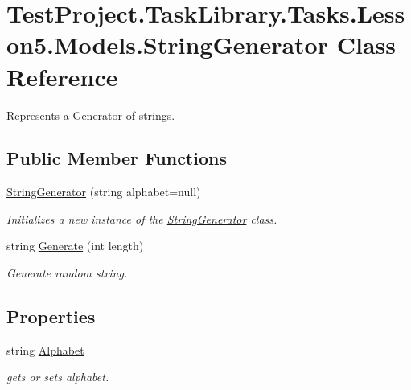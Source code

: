 \hypertarget{class_test_project_1_1_task_library_1_1_tasks_1_1_lesson5_1_1_models_1_1_string_generator}{}\section{Test\+Project.\+Task\+Library.\+Tasks.\+Lesson5.\+Models.\+String\+Generator Class Reference}
\label{class_test_project_1_1_task_library_1_1_tasks_1_1_lesson5_1_1_models_1_1_string_generator}


Represents a Generator of strings.  


\subsection*{Public Member Functions}
\begin{DoxyCompactItemize}
\item 
\mbox{\hyperlink{class_test_project_1_1_task_library_1_1_tasks_1_1_lesson5_1_1_models_1_1_string_generator_aa34f0671fe08522815cf9287818025f4}{String\+Generator}} (string alphabet=null)
\begin{DoxyCompactList}\small\item\em Initializes a new instance of the \mbox{\hyperlink{class_test_project_1_1_task_library_1_1_tasks_1_1_lesson5_1_1_models_1_1_string_generator}{String\+Generator}} class. \end{DoxyCompactList}\item 
string \mbox{\hyperlink{class_test_project_1_1_task_library_1_1_tasks_1_1_lesson5_1_1_models_1_1_string_generator_a9161991d02d0cb337ff3853defbd1678}{Generate}} (int length)
\begin{DoxyCompactList}\small\item\em Generate random string. \end{DoxyCompactList}\end{DoxyCompactItemize}
\subsection*{Properties}
\begin{DoxyCompactItemize}
\item 
string \mbox{\hyperlink{class_test_project_1_1_task_library_1_1_tasks_1_1_lesson5_1_1_models_1_1_string_generator_a5eaa63aacbe572ec3db3a3afc80933a9}{Alphabet}}
\begin{DoxyCompactList}\small\item\em gets or sets alphabet. \end{DoxyCompactList}\end{DoxyCompactItemize}


